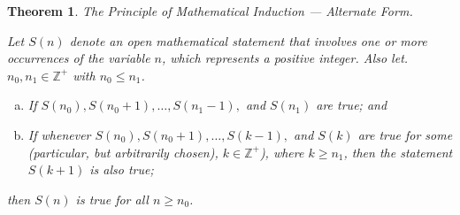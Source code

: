 \documentclass[12pt]{article}
\newtheorem{theorem}{Theorem} [section]
\begin{document}
\begin{theorem}The Principle of Mathematical Induction --- Alternate Form. \begin{em}Let $S(n)$ denote an open mathematical statement that involves one or more occurrences of the variable $n$, which represents a positive integer. Also let. $n_0, n_1 \in \mathbb{Z}^+$ with $n_0 \leq n_1$. 
\begin{enumerate} [(a)]
\item If $S(n_0), S(n_0 + 1), \dots , S(n_1 - 1),$ and  $S(n_1)$ are true; and
\item If whenever $S(n_0), S(n_0 + 1), \dots , S(k - 1),$ and  $S(k)$ are true for some (particular, but arbitrarily chosen), $k \in \mathbb{Z}^+$), where $k \geq n_1$, then the statement $S(k+1)$ is also true;
\end{enumerate}
then $S(n)$ is true for all $n \geq n_0$.
\end{em}
\end{theorem}
\end{document}
